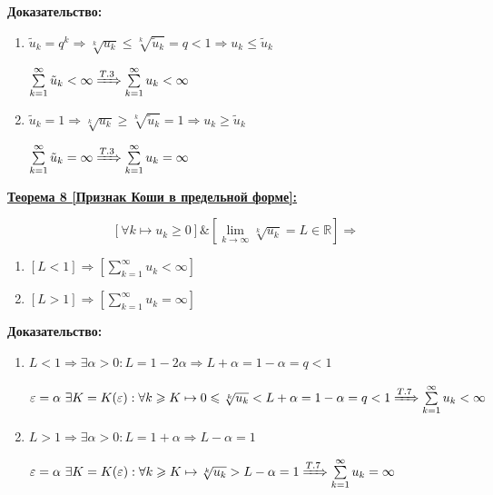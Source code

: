 \documentclass[a4paper,12pt]{article} %
\newcommand{\R}{\mathbb{R}}
\newcommand{\series}{\sum\limits_{k=1}^{\infty}}
\newcommand{\useriesl}{\sum\limits_{k=1}^{\infty} u_k < \infty}
\newcommand{\useriese}{\sum\limits_{k=1}^{\infty} u_k = \infty}
\begin{document}
\textbf{Доказательство:}

\begin{enumerate}
	\item $\tilde{u}_k = q^k \Rightarrow \sqrt[k]{u_k} \leqslant \sqrt[k]{\tilde{u}_k} = q < 1 \Rightarrow u_k \leqslant \tilde{u}_k$
	
	$\series \tilde{u}_k < \infty \xRightarrow[]{T.3} \useriesl$
	\item $\tilde{u}_k = 1 \Rightarrow \sqrt[k]{u_k} \geqslant \sqrt[k]{\tilde{u}_k} = 1 \Rightarrow u_k \geqslant \tilde{u}_k$
	
	$\series \tilde{u}_k = \infty \xRightarrow[]{T.3} \useriese$
\end{enumerate}

\underline{\textbf{Теорема 8 [Признак Коши в предельной форме]:}}

$$\left[ \forall k \mapsto u_k \geqslant 0 \right] \& \left[ \lim\limits_{k \to \infty} \sqrt[k]{u_k} = L \in \R \right] \Rightarrow$$

\begin{enumerate}
	\item $\left[ L < 1 \right] \Rightarrow \left[ \useriesl \right]$
	\item $\left[ L > 1 \right] \Rightarrow \left[ \useriese \right]$
\end{enumerate}

\textbf{Доказательство:}

\begin{enumerate}
	\item $L < 1 \Rightarrow \exists \alpha > 0: L = 1 - 2\alpha \Rightarrow L + \alpha = 1 - \alpha = q < 1$
	
	$\varepsilon = \alpha \ \exists K = K(\varepsilon): \forall k \geqslant K \mapsto 0 \leqslant \sqrt[k]{u_k} < L + \alpha = 1 - \alpha = q < 1 \xRightarrow[]{T.7} \useriesl$
	\item $L > 1 \Rightarrow \exists \alpha > 0: L = 1 + \alpha \Rightarrow L - \alpha = 1$
	
	$\varepsilon = \alpha \ \exists K = K(\varepsilon): \forall k \geqslant K \mapsto \sqrt[k]{u_k} > L - \alpha = 1 \xRightarrow[]{T.7} \useriese$
\end{enumerate}
\end{document}
